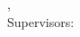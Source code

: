 \hfill
\vfill
{
	\small
	\textbf{\thesisName} \\
	\textit{\thesisTitle} \\
	\thesisSubject, \thesisDate \\
	Supervisors: \thesisFirstSupervisor\ \\[1.5em]
	\textbf{\thesisUniversity} \\
	\textit{\thesisUniversityGroup} \\
	\thesisUniversityDepartment \\
	\thesisUniversityCity
}

